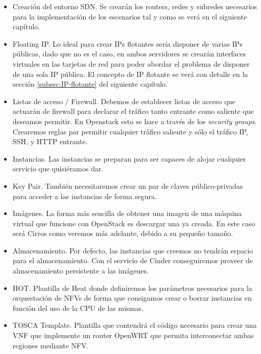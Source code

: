 \begin{itemize}
\item Creación del entorno SDN. Se crearán los routers, redes y subredes necesarios para la implementación de los escenarios tal y como se verá en el siguiente capítulo.
\item Floating IP. Lo ideal para crear IPs flotantes sería disponer de varias IPs públicas, dado que no es el caso, en ambos servidores se crearán interfaces virtuales en las tarjetas de red para poder abordar el problema de disponer de una sola IP pública. El concepto de  IP flotante se verá con detalle en la sección \ref{subsec:IP-flotante} del siguiente capítulo.
\item Listas de acceso / Firewall. Debemos de establecer listas de acceso que actuarán de firewall para declarar el tráfico tanto entrante como saliente que deseamos permitir. En Openstack esto se hace a través de los \textit{security groups}. Crearemos reglas par permitir cualquier tráfico saliente y sólo el tráfico IP, SSH, y HTTP entrante.
\item Instancias. Las instancias se preparan para ser capaces de alojar cualquier servicio que quisiéramos dar.
\item Key Pair. También necesitaremos crear un par de claves público-privadas para acceder a las instancias de forma segura.
\item Imágenes. La forma más sencilla de obtener una imagen de una máquina virtual que funcione con OpenStack es descargar una ya creada. En este caso será Cirros como veremos más adelante, debido a su pequeño tamaño.
\item Almacenamiento. Por defecto, las instancias que creemos no tendrán espacio para el almacenamiento. Con el servicio de Cinder conseguiremos proveer de almacenamiento persistente a las imágenes.
\item HOT. Plantilla de Heat donde definiremos los parámetros necesarios para la orquestación de NFVs de forma que consigamos crear o borrar instancias en función del uso de la CPU de las mismas.
\item TOSCA Template. Plantilla que contendrá el código necesario para crear una VNF que implemente un router OpenWRT que permita interconectar ambas regiones mediante NFV.
\end{itemize}








